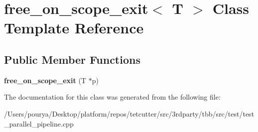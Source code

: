 \hypertarget{classfree__on__scope__exit}{}\section{free\+\_\+on\+\_\+scope\+\_\+exit$<$ T $>$ Class Template Reference}
\label{classfree__on__scope__exit}
\subsection*{Public Member Functions}
\begin{DoxyCompactItemize}
\item 
\hypertarget{classfree__on__scope__exit_a85ac65cf1399789d15b30c4f5d260b0f}{}{\bfseries free\+\_\+on\+\_\+scope\+\_\+exit} (T $\ast$p)\label{classfree__on__scope__exit_a85ac65cf1399789d15b30c4f5d260b0f}

\end{DoxyCompactItemize}


The documentation for this class was generated from the following file\+:\begin{DoxyCompactItemize}
\item 
/\+Users/pourya/\+Desktop/platform/repos/tetcutter/src/3rdparty/tbb/src/test/test\+\_\+parallel\+\_\+pipeline.\+cpp\end{DoxyCompactItemize}
